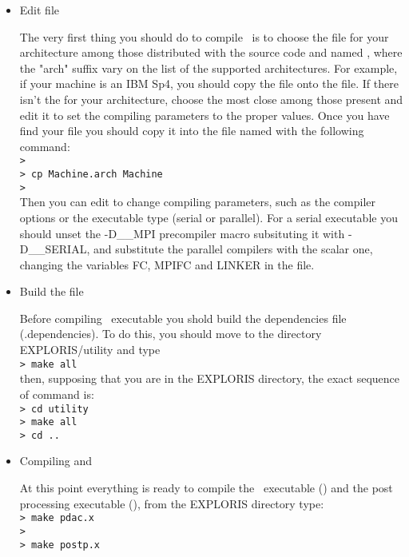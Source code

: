 \begin{itemize}

\item Edit  file

      The very first thing you should do to compile \PDAC\ is to choose
      the  file for your architecture among those distributed with
      the source code and named , where the "arch" suffix
      vary on the list of the supported architectures. For example, if
      your machine is an IBM Sp4, you should copy the file 
      onto the  file. If there isn't the  for 
      your architecture, choose the most close among those present
      and edit it to set the compiling parameters to the proper values.
      Once you have find your  file you should copy it into the
      file named  with the following command:\\
      {\tt >}\\
      {\tt > cp Machine.arch Machine}\\
      {\tt >}\\
      Then you can edit  to change compiling parameters,
      such as the compiler options or the executable type (serial or parallel).
      For a serial executable you should unset the -D\_\_MPI precompiler macro
      subsituting it with -D\_\_SERIAL, and substitute the parallel compilers
      with the scalar one, changing the variables FC, MPIFC and LINKER
      in the  file.

\item Build the  file

      Before compiling \PDAC\ executable you shold build the 
      dependencies file (.dependencies). To do this, you should
      move to the directory  EXPLORIS/utility and type \\
      {\tt > make all}\\
      then, supposing that you are in the EXPLORIS directory, 
      the exact sequence of command is:\\
      {\tt > cd utility}\\
      {\tt > make all}\\
      {\tt > cd ..}\\

\item Compiling  and 

      At this point everything is ready to compile the \PDAC\ executable
      () and the post processing executable (), from
      the EXPLORIS directory type:\\
      {\tt > make pdac.x}\\
      {\tt >}\\
      {\tt > make postp.x}\\


\end{itemize}
